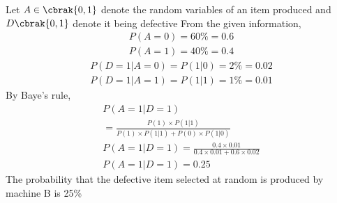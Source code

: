 Let $A \in \cbrak{0,1}$ denote the random variables of an item produced and $D \cbrak{0,1}$ denote it being defective
%
From the given information,
\begin{align}
P(A=0) = 60 {\%} = 0.6\\
P(A=1) = 40 {\%} =0.4
\end{align}
\begin{align}
    P(D=1|A=0) = P(1|0) = 2 {\%} =0.02
   \\P(D=1|A=1) = P(1|1) =  1 {\%} =0.01
\end{align}
By Baye's rule,
\begin{multline}
    P(A=1|D=1) 
    \\
    = \frac{P(1)\times P(1|1)}{P(1)\times P(1|1) + P(0)\times P(1|0)}
    \\P(A=1|D=1) = \frac{0.4\times 0.01}{0.4\times 0.01 + 0.6\times 0.02}
    \\P(A=1|D=1) = 0.25
\end{multline}
The probability that the defective item selected at random is produced by machine B is 25{\%}